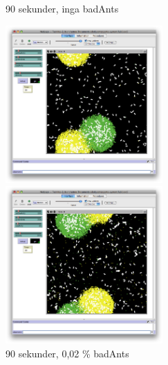 \documentclass[titlepage, a4paper, 12pt]{article}
\begin{document}
\begin{figure}
  \begin{minipage}[b]{0.5\linewidth} %
    \centering
    \caption{90 sekunder, inga badAnts}
    \includegraphics[width=6cm]{images/no-bad-90.png}
  \end{minipage}
  \hspace{0.5cm} %
  \begin{minipage}[b]{0.5\linewidth}
    \centering
    \caption{90 sekunder, 0,02 \% badAnts}
    \includegraphics[width=6cm]{images/10-bad-90.png}
  \end{minipage}
\end{figure}
\end{document}

